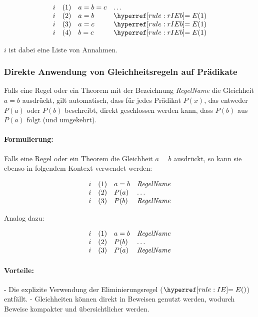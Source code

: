 \documentclass[main.tex]{subfiles}
\begin{document}
\[
\begin{array}{llll}
	i & (1) & a = b = c & \dots \\
        i & (2) & a = b & \rIEb{1} \\
 	i & (3) & a = c & \rIEb{1} \\
        i & (4) & b = c & \rIEb{1} \\
\end{array}
\]

\(i\) ist dabei eine Liste von Annahmen.

\subsubsection{Direkte Anwendung von Gleichheitsregeln auf Prädikate}

Falls eine Regel oder ein Theorem mit der Bezeichnung \textit{RegelName} die Gleichheit \(a = b\) ausdrückt, gilt automatisch, dass für jedes Prädikat \(P(x)\), das entweder \(P(a)\) oder \(P(b)\) beschreibt, direkt geschlossen werden kann, dass \(P(b)\) aus \(P(a)\) folgt (und umgekehrt).

\paragraph{Formulierung:}
Falls eine Regel oder ein Theorem die Gleichheit \(a = b\) ausdrückt, so kann sie ebenso in folgendem Kontext verwendet werden:

\[
\begin{array}{llll}
	i & (1) & a = b & \text{\textit{RegelName}} \\
	i & (2) & P(a) & \dots \\
	i & (3) & P(b) & \text{\textit{RegelName}} \\
\end{array}
\]

Analog dazu:

\[
\begin{array}{llll}
	i & (1) & a = b & \text{\textit{RegelName}} \\
	i & (2) & P(b) & \dots \\
	i & (3) & P(a) & \text{\textit{RegelName}} \\
\end{array}
\]

\paragraph{Vorteile:}
- Die explizite Verwendung der Eliminierungsregel (\(\rIE{}\)) entfällt.
- Gleichheiten können direkt in Beweisen genutzt werden, wodurch Beweise kompakter und übersichtlicher werden.
\end{document}
